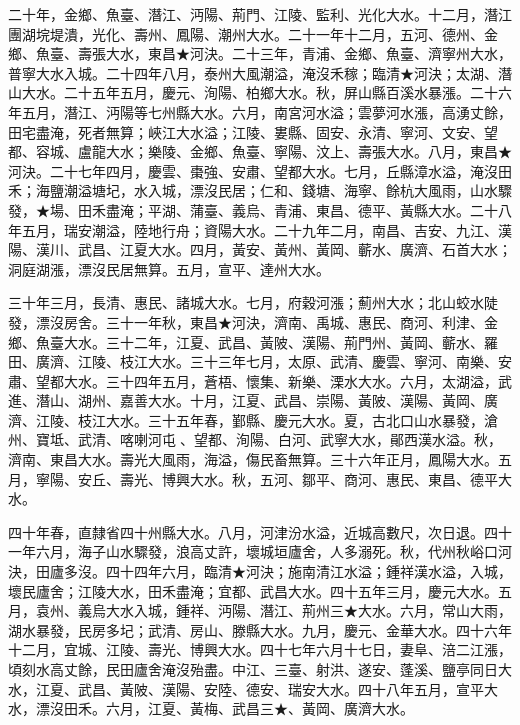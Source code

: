 \begin{pinyinscope}
二十年，金鄉、魚臺、潛江、沔陽、荊門、江陵、監利、光化大水。十二月，潛江團湖垸堤潰，光化、壽州、鳳陽、潮州大水。二十一年十二月，五河、德州、金鄉、魚臺、壽張大水，東昌★河決。二十三年，青浦、金鄉、魚臺、濟寧州大水，普寧大水入城。二十四年八月，泰州大風潮溢，淹沒禾稼；臨清★河決；太湖、潛山大水。二十五年五月，慶元、洵陽、柏鄉大水。秋，屏山縣百溪水暴漲。二十六年五月，潛江、沔陽等七州縣大水。六月，南宮河水溢；雲夢河水漲，高湧丈餘，田宅盡淹，死者無算；峽江大水溢；江陵、婁縣、固安、永清、寧河、文安、望都、容城、盧龍大水；樂陵、金鄉、魚臺、寧陽、汶上、壽張大水。八月，東昌★河決。二十七年四月，慶雲、棗強、安肅、望都大水。七月，丘縣漳水溢，淹沒田禾；海鹽潮溢塘圮，水入城，漂沒民居；仁和、錢塘、海寧、餘杭大風雨，山水驟發，★場、田禾盡淹；平湖、蒲臺、義烏、青浦、東昌、德平、黃縣大水。二十八年五月，瑞安潮溢，陸地行舟；資陽大水。二十九年二月，南昌、吉安、九江、漢陽、漢川、武昌、江夏大水。四月，黃安、黃州、黃岡、蘄水、廣濟、石首大水；洞庭湖漲，漂沒民居無算。五月，宣平、達州大水。

三十年三月，長清、惠民、諸城大水。七月，府穀河漲；薊州大水；北山蛟水陡發，漂沒房舍。三十一年秋，東昌★河決，濟南、禹城、惠民、商河、利津、金鄉、魚臺大水。三十二年，江夏、武昌、黃陂、漢陽、荊門州、黃岡、蘄水、羅田、廣濟、江陵、枝江大水。三十三年七月，太原、武清、慶雲、寧河、南樂、安肅、望都大水。三十四年五月，蒼梧、懷集、新樂、溧水大水。六月，太湖溢，武進、潛山、湖州、嘉善大水。十月，江夏、武昌、崇陽、黃陂、漢陽、黃岡、廣濟、江陵、枝江大水。三十五年春，鄞縣、慶元大水。夏，古北口山水暴發，滄州、寶坻、武清、喀喇河屯、望都、洵陽、白河、武寧大水，鄖西漢水溢。秋，濟南、東昌大水。壽光大風雨，海溢，傷民畜無算。三十六年正月，鳳陽大水。五月，寧陽、安丘、壽光、博興大水。秋，五河、鄒平、商河、惠民、東昌、德平大水。

四十年春，直隸省四十州縣大水。八月，河津汾水溢，近城高數尺，次日退。四十一年六月，海子山水驟發，浪高丈許，壞城垣廬舍，人多溺死。秋，代州秋峪口河決，田廬多沒。四十四年六月，臨清★河決；施南清江水溢；鍾祥漢水溢，入城，壞民廬舍；江陵大水，田禾盡淹；宜都、武昌大水。四十五年三月，慶元大水。五月，袁州、義烏大水入城，鍾祥、沔陽、潛江、荊州三★大水。六月，常山大雨，湖水暴發，民房多圮；武清、房山、滕縣大水。九月，慶元、金華大水。四十六年十二月，宜城、江陵、壽光、博興大水。四十七年六月十七日，妻阜、涪二江漲，頃刻水高丈餘，民田廬舍淹沒殆盡。中江、三臺、射洪、遂安、蓬溪、鹽亭同日大水，江夏、武昌、黃陂、漢陽、安陸、德安、瑞安大水。四十八年五月，宣平大水，漂沒田禾。六月，江夏、黃梅、武昌三★、黃岡、廣濟大水。


\end{pinyinscope}
